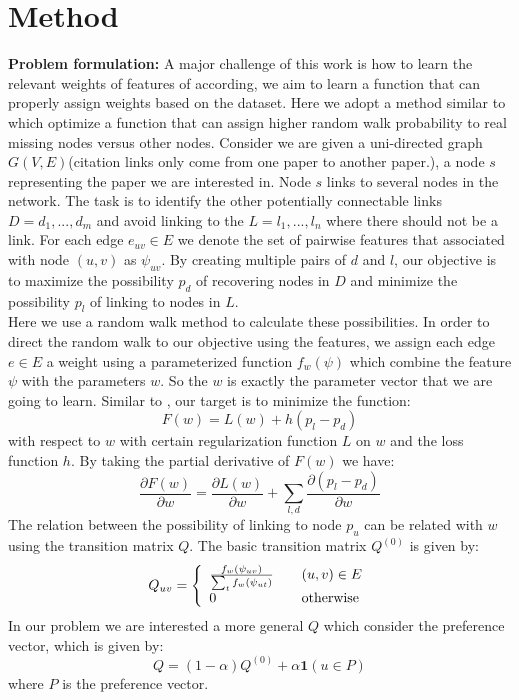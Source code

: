 \documentclass{article} %
\begin{document}
\section{Method}
\textbf{Problem formulation:} A major challenge of this work is how to learn the relevant weights of features of according, we aim to learn a function that can properly assign weights based on the dataset. Here we adopt a method similar to \cite{Backstrom:2011:SRW:1935826.1935914} which optimize a function that can assign higher random walk probability to real missing nodes versus other nodes. Consider we are given a uni-directed graph $G(V,E)$(citation links only come from one paper to another paper.), a node $s$ representing the paper we are interested in. Node $s$ links to several nodes in the network. The task is to identify the other potentially connectable links $D={d_1,...,d_m}$ and avoid linking to the $L={l_1,...,l_n}$ where there should not be a link. For each edge $e_{uv}\in E$ we denote the set of pairwise features that associated with node $(u,v)$ as $\psi_{uv}$. By creating multiple pairs of $d$ and $l$, our objective is to maximize the possibility $p_d$ of recovering nodes in $D$ and minimize the possibility $p_l$ of linking to nodes in $L$. \\
	Here we use a random walk method to calculate these possibilities. In order to direct the random walk to our objective using the features, we assign each edge $e \in E$ a weight using a parameterized function $f_w(\psi)$ which combine the feature $\psi$ with the parameters $w$. So the $w$ is exactly the parameter vector that we are going to learn. Similar to \cite{Backstrom:2011:SRW:1935826.1935914}, our target is to minimize the function:
\begin{equation}
F(w)=L(w) + h(p_l - p_d)
\end{equation} 
with respect to $w$ with certain regularization function $L$ on $w$ and the loss function $h$. By taking the partial derivative of $F(w)$ we have:
\begin{equation}
\frac{\partial F(w)}{\partial w} = \frac{\partial L(w)}{\partial w} + \sum_{l,d} \frac{\partial(p_l-p_d)}{\partial w}
\end{equation}
	The relation between the possibility of linking to node $p_u$ can be related with $w$ using the transition matrix $Q$. The basic transition matrix $Q^{(0)}$ is given by:
\[
  Q_{uv} = \left\{ 
  \begin{array}{l l}
    \frac{f_w(\psi_{uv})}{\sum_t f_w(\psi_{ut})} & \quad (u,v)\in E\\
    0 & \quad \text{otherwise}\\
  \end{array} \right.
\]
	In our problem we are interested a more general $Q$ which consider the preference vector, which is given by:
\begin{equation}
Q = (1 - \alpha) Q^{(0)} + \alpha \textbf{1}(u \in P)
\end{equation}
where $P$ is the preference vector. 
\end{document}
